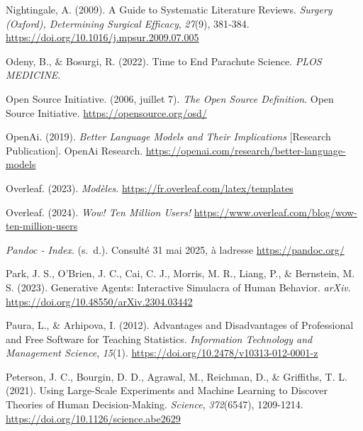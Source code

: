 \documentclass[
  letterpaper,
  DIV=11,
  numbers=noendperiod,
  oneside]{scrreprt}
\newlength{\cslhangindent}
\newlength{\cslentryspacingunit} %
\newenvironment{CSLReferences}[2] %
 {%
  \setlength{\parindent}{0pt}
  \ifodd #1
  \let\oldpar\par
  \def\par{\hangindent=\cslhangindent\oldpar}
  \fi
  \setlength{\parskip}{#2\cslentryspacingunit}
 }%
 {}
\begin{document}
\begin{CSLReferences}{1}{0}
\leavevmode{}%
Nightingale, A. (2009). A Guide to Systematic Literature Reviews.
\emph{Surgery (Oxford), Determining Surgical Efficacy}, \emph{27}(9),
381‑384. \url{https://doi.org/10.1016/j.mpsur.2009.07.005}

\leavevmode{}%
Odeny, B., \& Bosurgi, R. (2022). Time to End Parachute Science.
\emph{PLOS MEDICINE}.

\leavevmode{}%
Open Source Initiative. (2006, juillet 7). \emph{The {Open Source
Definition}}. Open Source Initiative. \url{https://opensource.org/osd/}

\leavevmode{}%
OpenAi. (2019). \emph{Better Language Models and Their Implications}
{[}Research Publication{]}. OpenAi Research.
\url{https://openai.com/research/better-language-models}

\leavevmode{}%
Overleaf. (2023). \emph{Modèles}.
\url{https://fr.overleaf.com/latex/templates}

\leavevmode{}%
Overleaf. (2024). \emph{Wow! {Ten} Million Users!}
\url{https://www.overleaf.com/blog/wow-ten-million-users}

\leavevmode{}%
\emph{Pandoc - Index}. (s.~d.). Consulté 31 mai 2025, à
l\textquotesingle adresse \url{https://pandoc.org/}

\leavevmode{}%
Park, J. S., O'Brien, J. C., Cai, C. J., Morris, M. R., Liang, P., \&
Bernstein, M. S. (2023). Generative {Agents}: {Interactive Simulacra} of
{Human Behavior}. \emph{arXiv}.
\url{https://doi.org/10.48550/arXiv.2304.03442}

\leavevmode{}%
Paura, L., \& Arhipova, I. (2012). Advantages and {Disadvantages} of
{Professional} and {Free Software} for {Teaching Statistics}.
\emph{Information Technology and Management Science}, \emph{15}(1).
\url{https://doi.org/10.2478/v10313-012-0001-z}

\leavevmode{}%
Peterson, J. C., Bourgin, D. D., Agrawal, M., Reichman, D., \&
Griffiths, T. L. (2021). Using {Large-Scale Experiments} and {Machine
Learning} to {Discover Theories} of {Human Decision-Making}.
\emph{Science}, \emph{372}(6547), 1209‑1214.
\url{https://doi.org/10.1126/science.abe2629}


\end{CSLReferences}
\end{document}
